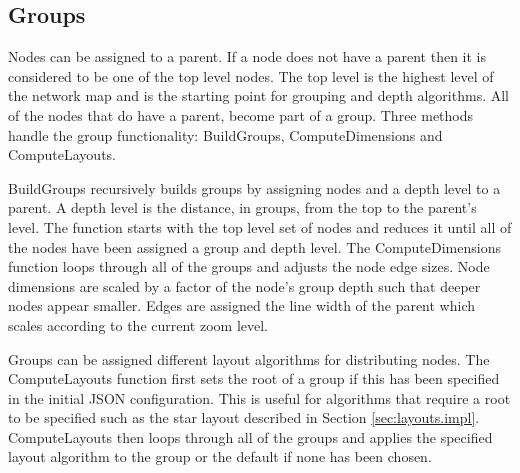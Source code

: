 \documentclass[11pt, a4paper]{article}
\begin{document}

\subsection{Groups}
\label{sec:groups.impl}

Nodes can be assigned to a parent. If a node does not have a parent then it is
considered to be one of the top level nodes. The top level is the highest level
of the network map and is the starting point for grouping and depth algorithms.
All of the nodes that do have a parent, become part of a group.  Three methods
handle the group functionality: BuildGroups, ComputeDimensions and
ComputeLayouts.

BuildGroups recursively builds groups by assigning nodes and a depth level to a
parent. A depth level is the distance, in groups, from the top to the parent's
level. The function starts with the top level set of nodes and reduces it until
all of the nodes have been assigned a group and depth level. The
ComputeDimensions function loops through all of the groups and adjusts the node
edge sizes. Node dimensions are scaled by a factor of the node's group depth
such that deeper nodes appear smaller. Edges are assigned the line width of the 
parent which scales according to the current zoom level.

Groups can be assigned different layout algorithms for distributing nodes. The
ComputeLayouts function first sets the root of a group if this has been
specified in the initial JSON configuration. This is useful for algorithms that
require a root to be specified such as the star layout described in Section
\ref{sec:layouts.impl}. ComputeLayouts then loops through all of the groups and
applies the specified layout algorithm to the group or the default if none has
been chosen. 
\end{document}
